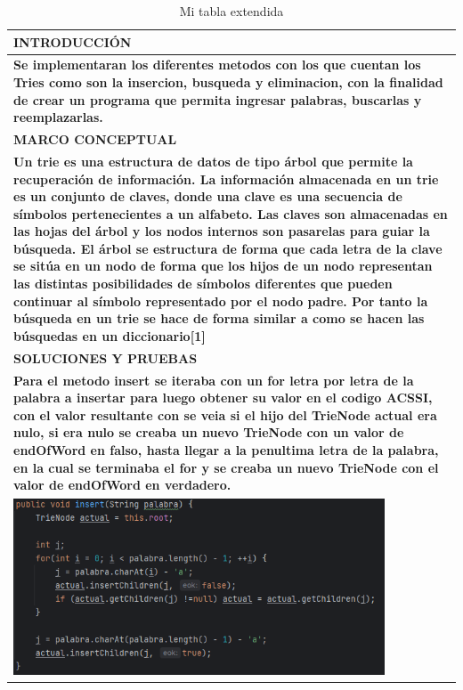 \documentclass[9pt]{article}
\begin{document}
	\begin{longtable}{|p{15cm}|}
		\caption{Mi tabla extendida}\\
		\hline 
		\rowcolor{tablebackground}
		\color{white}\textbf{INTRODUCCIÓN}  \\
		\hline 
		\textbf{Se implementaran los diferentes metodos con los que cuentan los Tries
		como son la insercion, busqueda y eliminacion, con la finalidad de crear un programa
		que permita ingresar palabras, buscarlas y reemplazarlas.}  \\
		\hline 
		\rowcolor{tablebackground}
		\color{white}\textbf{MARCO CONCEPTUAL}  \\
		\hline 
		\textbf{Un trie es una estructura de datos de tipo árbol que permite
		 la recuperación de información.
		  La información almacenada en un trie es un conjunto de claves, donde 
		  una clave es una secuencia de símbolos pertenecientes a un alfabeto. 
		  Las claves son almacenadas en las hojas del árbol y los nodos internos 
		  son pasarelas para guiar la búsqueda. El árbol se estructura de forma 
		  que cada letra de la clave se sitúa en un nodo de forma que los hijos
		de un nodo representan las distintas posibilidades de símbolos diferentes
		que pueden continuar al símbolo representado por el nodo padre. Por tanto 
		la búsqueda en un trie se hace de forma similar a como se hacen las búsquedas 
		en un diccionario[1]}  \\		
		\hline 
		\rowcolor{tablebackground}
		\color{white}\textbf{SOLUCIONES Y PRUEBAS}  \\
		\hline
		\textbf{ Para el metodo insert se iteraba con un for letra por letra de la palabra a insertar
		para luego obtener su valor en el codigo ACSSI, con el valor resultante con
		se veia si el hijo del TrieNode actual era nulo, si era nulo se creaba un nuevo TrieNode
		con un valor de endOfWord en falso, hasta llegar a la penultima letra de la palabra, en la cual se terminaba 
		el for y se creaba un nuevo TrieNode con el valor de endOfWord en verdadero.}\\
		\includegraphics[width=0.85\textwidth,keepaspectratio]{img/insert.png}\\



\end{longtable}
\end{document}
